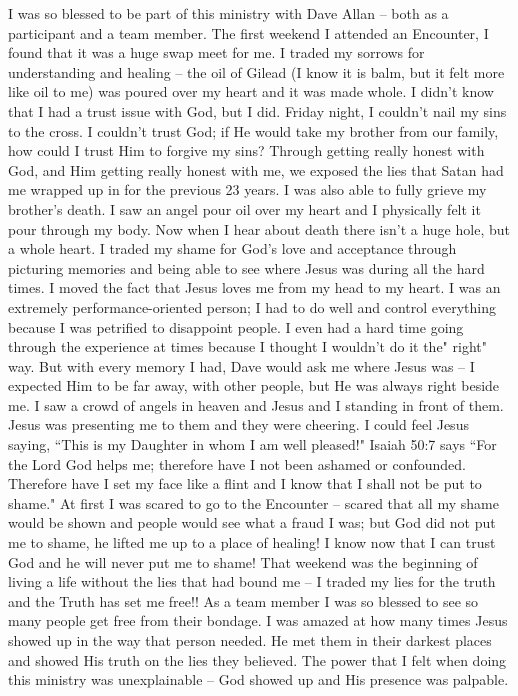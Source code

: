\documentclass[oneside,12pt]{book}
\begin{document}
I was so blessed to be part of this ministry with Dave Allan -- both as a participant and a team member.
The first weekend I attended an Encounter, I found that it was a huge swap meet for me. I traded my sorrows for understanding and healing -- the oil of Gilead (I know it is balm, but it felt more like oil to me) was poured over my heart and it was made whole. I didn't know that I had a trust issue with God, but I did. Friday night, I couldn't nail my sins to the cross. I couldn't trust God; if He would take my brother from our family, how could I trust Him to forgive my sins? Through getting really honest with God, and Him getting really honest with me, we exposed the lies that Satan had me wrapped up in for the previous 23 years. I was also able to fully grieve my brother's death. I saw an angel pour oil over my heart and I physically felt it pour through my body. Now when I hear about death there isn't a huge hole, but a whole heart.
I traded my shame for God's love and acceptance through picturing memories and being able to see where Jesus was during all the hard times. I moved the fact that Jesus loves me from my head to my heart.
I was an extremely performance-oriented person; I had to do well and control everything because I was petrified to disappoint people. I even had a hard time going through the experience at times because I thought I wouldn't do it the" right" way. But with every memory I had, Dave would ask me where Jesus was -- I expected Him to be far away, with other people, but He was always right beside me. I saw a crowd of angels in heaven and Jesus and I standing in front of them. Jesus was presenting me to them and they were cheering. I could feel Jesus saying, ``This is my Daughter in whom I am well pleased!"
Isaiah 50:7 says ``For the Lord God helps me; therefore have I not been ashamed or confounded. Therefore have I set my face like a flint and I know that I shall not be put to shame." At first I was scared to go to the Encounter -- scared that all my shame would be shown and people would see what a fraud I was; but God did not put me to shame, he lifted me up to a place of healing! I know now that I can trust God and he will never put me to shame!
That weekend was the beginning of living a life without the lies that had bound me -- I traded my lies for the truth and the Truth has set me free!!
As a team member I was so blessed to see so many people get free from their bondage. I was amazed at how many times Jesus showed up in the way that person needed. He met them in their darkest places and showed His truth on the lies they believed. The power that I felt when doing this ministry was unexplainable -- God showed up and His presence was palpable.
\end{document}
